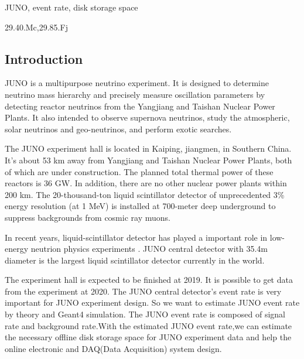 \documentclass[a4paper,10pt,twoside]{paper}
\begin{document}
	\begin{keyword}
		JUNO, event rate, disk storage space
	\end{keyword}

	\begin{pacs}
		29.40.Mc,29.85.Fj
	\end{pacs}


	\begin{multicols}{2}

		\section{Introduction}
		JUNO\cite{lab1} is a multipurpose neutrino experiment. It is
		designed to determine neutrino mass hierarchy and precisely
		measure oscillation parameters by detecting reactor
		neutrinos from the Yangjiang and Taishan Nuclear Power
		Plants. It also intended to observe supernova neutrinos,
		study the atmospheric, solar neutrinos and geo-neutrinos,
		and perform exotic searches.

		The JUNO experiment hall is located in Kaiping, jiangmen,
		in Southern China. It's about 53 km away from Yangjiang
		and Taishan Nuclear Power Plants, both of which are
		under construction. The planned total thermal power of
		these reactors is 36 GW. In addition, there are no other
		nuclear power plants within 200 km.  The  20-thousand-ton
		liquid scintillator detector of unprecedented 3\% energy
		resolution (at 1 MeV) is installed at 700-meter deep
		underground to suppress backgrounds from cosmic ray muons. 

		In recent years, liquid-scintillator detector has played a important role in low-energy
		neutrion physics experiments \cite{lab2, lab3, lab4, lab5, lab6, lab7}.
		JUNO central detector with 35.4m diameter  is the largest
		liquid scintillator detector currently in the world. 

		The experiment hall is expected to be finished at 2019. 
		It is possible to get data from the experiment at 2020.
		The JUNO central detector's event rate is very important for 
		JUNO experiment design. So we want to estimate JUNO
		event rate by theory and Geant4 simulation. The
		JUNO event rate is composed of signal rate and background
		rate.With the estimated JUNO event rate,we can estimate the necessary
		offline disk storage space for JUNO experiment data and help the 
		online electronic and DAQ(Data Acquisition) system design.
		

\end{multicols}
\end{document}
